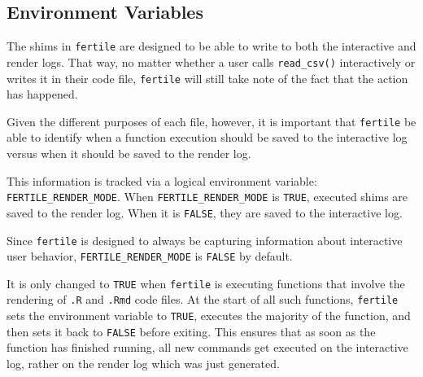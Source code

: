 \documentclass[12pt,twoside]{reedthesis}
\begin{document}
\hypertarget{environment-variables}{%
\subsection{Environment Variables}\label{environment-variables}}

The shims in \texttt{fertile} are designed to be able to write to both the interactive and render logs. That way, no matter whether a user calls \texttt{read\_csv()} interactively or writes it in their code file, \texttt{fertile} will still take note of the fact that the action has happened.

Given the different purposes of each file, however, it is important that \texttt{fertile} be able to identify when a function execution should be saved to the interactive log versus when it should be saved to the render log.

This information is tracked via a logical environment variable: \texttt{FERTILE\_RENDER\_MODE}. When \texttt{FERTILE\_RENDER\_MODE} is \texttt{TRUE}, executed shims are saved to the render log. When it is \texttt{FALSE}, they are saved to the interactive log.

Since \texttt{fertile} is designed to always be capturing information about interactive user behavior, \texttt{FERTILE\_RENDER\_MODE} is \texttt{FALSE} by default.

It is only changed to \texttt{TRUE} when \texttt{fertile} is executing functions that involve the rendering of \texttt{.R} and \texttt{.Rmd} code files. At the start of all such functions, \texttt{fertile} sets the environment variable to \texttt{TRUE}, executes the majority of the function, and then sets it back to \texttt{FALSE} before exiting. This ensures that as soon as the function has finished running, all new commands get executed on the interactive log, rather on the render log which was just generated.
\end{document}

